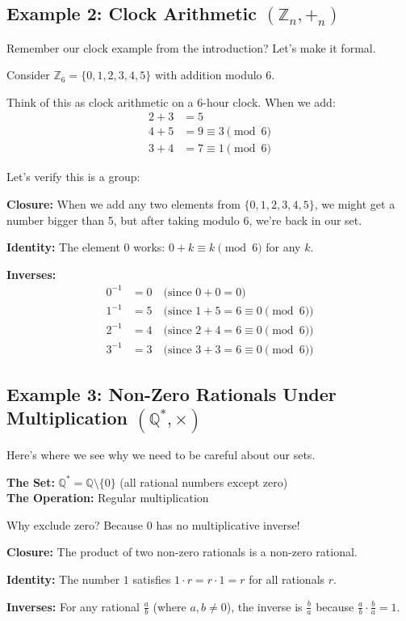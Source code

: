 \documentclass[12pt]{article}
\begin{document}
\subsection{\textcolor{HeaderColor}{Example 2: Clock Arithmetic $(\mathbb{Z}_n, +_n)$}}

Remember our clock example from the introduction? Let's make it formal.

\begin{examplebox}
Consider $\mathbb{Z}_6 = \{0, 1, 2, 3, 4, 5\}$ with addition modulo $6$.

Think of this as clock arithmetic on a 6-hour clock. When we add:
\begin{align}
2 + 3 &= 5 \\
4 + 5 &= 9 \equiv 3 \pmod{6} \\
3 + 4 &= 7 \equiv 1 \pmod{6}
\end{align}

Let's verify this is a group:

\textbf{Closure:} When we add any two elements from $\{0,1,2,3,4,5\}$, we might get a number bigger than 5, but after taking modulo 6, we're back in our set.

\textbf{Identity:} The element $0$ works: $0 + k \equiv k \pmod{6}$ for any $k$.

\textbf{Inverses:} 
\begin{align}
0^{-1} &= 0 \quad \text{(since } 0+0 = 0\text{)} \\
1^{-1} &= 5 \quad \text{(since } 1+5 = 6 \equiv 0 \pmod{6}\text{)} \\
2^{-1} &= 4 \quad \text{(since } 2+4 = 6 \equiv 0 \pmod{6}\text{)} \\
3^{-1} &= 3 \quad \text{(since } 3+3 = 6 \equiv 0 \pmod{6}\text{)}
\end{align}
\end{examplebox}

\subsection{\textcolor{HeaderColor}{Example 3: Non-Zero Rationals Under Multiplication $(\mathbb{Q}^*, \times)$}}

\begin{examplebox}
Here's where we see why we need to be careful about our sets.

\textbf{The Set:} $\mathbb{Q}^* = \mathbb{Q} \setminus \{0\}$ (all rational numbers except zero) \\
\textbf{The Operation:} Regular multiplication

Why exclude zero? Because $0$ has no multiplicative inverse!

\textbf{Closure:} The product of two non-zero rationals is a non-zero rational.

\textbf{Identity:} The number $1$ satisfies $1 \cdot r = r \cdot 1 = r$ for all rationals $r$.

\textbf{Inverses:} For any rational $\frac{a}{b}$ (where $a,b \neq 0$), the inverse is $\frac{b}{a}$ because $\frac{a}{b} \cdot \frac{b}{a} = 1$.
\end{examplebox}
\end{document}
